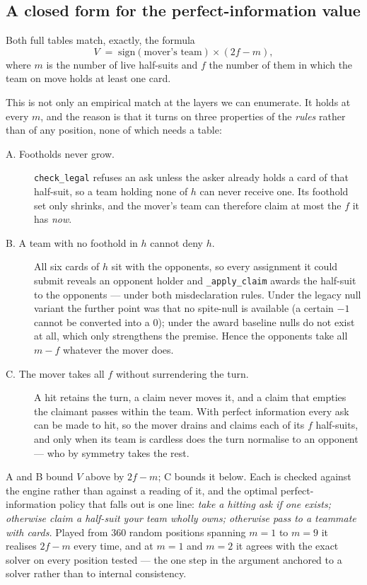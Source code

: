 \documentclass[11pt,a4paper]{article}
\begin{document}
\subsection{A closed form for the perfect-information value}

Both full tables match, exactly, the formula
\begin{equation}
V \;=\; \mathrm{sign}(\text{mover's team}) \times (2f - m),
\label{eq:closedform}
\end{equation}
where $m$ is the number of live half-suits and $f$ the number of them in which
the team on move holds at least one card.

This is not only an empirical match at the layers we can enumerate. It holds at
every $m$, and the reason is that it turns on three properties of the
\emph{rules} rather than of any position, none of which needs a table:

\begin{description}
\item[A. Footholds never grow.] \texttt{check\_legal} refuses an ask unless the
asker already holds a card of that half-suit, so a team holding none of $h$ can
never receive one. Its foothold set only shrinks, and the mover's team can
therefore claim at most the $f$ it has \emph{now}.
\item[B. A team with no foothold in $h$ cannot deny $h$.] All six cards of $h$
sit with the opponents, so every assignment it could submit reveals an opponent
holder and \texttt{\_apply\_claim} awards the half-suit to the opponents ---
under both misdeclaration rules. Under the legacy null variant the further
point was that no spite-null is available (a certain $-1$ cannot be
converted into a $0$); under the award baseline nulls do not exist at all,
which only strengthens the premise. Hence the opponents take all $m - f$
whatever the mover does.
\item[C. The mover takes all $f$ without surrendering the turn.] A hit retains
the turn, a claim never moves it, and a claim that empties the claimant passes
within the team. With perfect information every ask can be made to hit, so the
mover drains and claims each of its $f$ half-suits, and only when its team is
cardless does the turn normalise to an opponent --- who by symmetry takes the
rest.
\end{description}

A and B bound $V$ above by $2f - m$; C bounds it below. Each is checked against
the engine rather than against a reading of it, and the optimal
perfect-information policy that falls out is one line: \emph{take a hitting ask
if one exists; otherwise claim a half-suit your team wholly owns; otherwise pass
to a teammate with cards.} Played from $360$ random positions spanning $m = 1$
to $m = 9$ it realises $2f - m$ every time, and at $m = 1$ and $m = 2$ it agrees
with the exact solver on every position tested --- the one step in the argument
anchored to a solver rather than to internal consistency.
\end{document}
